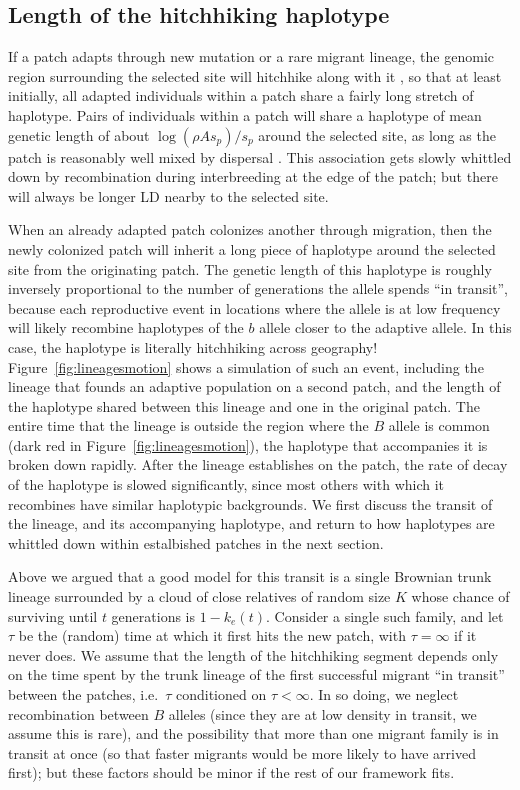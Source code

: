 \documentclass{article}
\begin{document}
\subsection{Length of the hitchhiking haplotype}
\label{ss:haplotype_length}

If a patch adapts through new mutation or a rare migrant lineage, the
genomic region surrounding the selected site will hitchhike along with it \citep{maynardsmith1974hitchhiking},
so that at least initially, all adapted individuals within a patch
share a fairly long stretch of haplotype. 
Pairs of individuals within a patch will share a haplotype of mean genetic length of
about $\log(\rho A s_p)/s_p$ around the selected site, 
as long as the patch is reasonably well mixed by dispersal
\citep[otherwise see][]{barton2013genetic}.
This association gets slowly whittled down by recombination during interbreeding at the edge of the patch;
but there will always be longer LD nearby to the selected site. 

When an already adapted patch colonizes another through migration,
then the newly colonized patch will inherit a long piece of haplotype around the selected site from the originating patch.
The genetic length of this haplotype is roughly inversely proportional to the
number of generations the allele spends ``in transit'', 
because each reproductive event in locations where the allele is at
low frequency will likely recombine haplotypes of the $b$ allele closer to the adaptive allele. 
In this case, the haplotype is literally hitchhiking across geography!
Figure~\ref{fig:lineagesmotion} shows a simulation of such an event,
including the lineage that founds an adaptive population on a second patch,
and the length of the haplotype shared between this lineage and one in the original patch.
The entire time that the lineage is outside the region where the $B$ allele is common (dark red in Figure~\ref{fig:lineagesmotion}), 
the haplotype that accompanies it is broken down rapidly. 
After the lineage establishes on the patch, the rate of decay of the haplotype is slowed significantly, 
since most others with which it recombines have similar haplotypic backgrounds. 
We first discuss the transit of the lineage, and its accompanying haplotype, and return
to how haplotypes are whittled down within estalbished patches in the next section.


Above we argued that a good model for this transit is a single Brownian trunk lineage
surrounded by a cloud of close relatives of random size $K$
whose chance of surviving until $t$ generations is $1-k_e(t)$.
Consider a single such family, and let $\tau$ be the (random) time at which it first hits the new patch,
with $\tau = \infty$ if it never does. 
We assume that the length of the hitchhiking segment depends only on 
the time spent by the trunk lineage of the first successful migrant ``in transit'' between the patches,
i.e.\ $\tau$ conditioned on $\tau < \infty$.
In so doing, we neglect 
recombination between $B$ alleles (since they are at low density in transit, we assume this is rare),
and the possibility that more than one migrant family is in transit at once
(so that faster migrants would be more likely to have arrived first);
but these factors should be minor if the rest of our framework fits.
\end{document}
